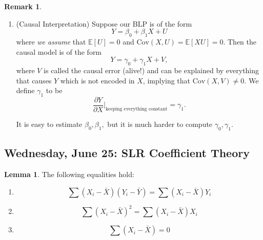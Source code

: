 \documentclass[10pt, oneside]{article}
\newcommand{\Cov}{\text{Cov}}
\newcommand{\bbE}{\mathbb{E}}
\theoremstyle{definition}
\newtheorem{rem}{Remark}
\newtheorem{lem}{Lemma}
\begin{document}
\begin{rem}
\begin{enumerate}
\begin{proof}
\begin{align*}
    &= \bbE[Y \bbE[Y \mid X]] - \bbE[\bbE[Y \mid X]^2] - b_0\bbE[V] - b_1 \bbE[VX]\\
    &= 0 - 0 - b_1\bbE[\bbE[VX \mid X]] = 0
\end{align*}
Hence, we minimize by taking derivatives and the first term drops out, yielding our result.
    \end{proof}
So we minimized $\bbE[(Y - b_0 - b_1 X)^2] = \bbE[Z^2]$ and to do this explicitly, 
\[\frac{\partial f}{\partial b_0} = -2\bbE[Y - b_0 - b_1 X] \implies \bbE[U] = 0 \qquad \frac{\partial f}{\partial b_1} = -2\bbE[X(Y - b_0 - b_1X)] \implies \bbE[UX] = 0\] Thus, 
\[\bbE[U] = 0\] and 
\[\Cov(U,X) = \bbE[UX] - \bbE[U]\bbE[X] = 0\] and thus the $\text{BLP}$ satisfies the conditions in the previous example.
\item (Causal Interpretation) Suppose our BLP is of the form 
    \[Y = \beta_0 + \beta_1 X + U\] where \textit{we assume} that $\bbE[U] = 0$ and $\Cov(X,U) = \bbE[XU] = 0.$ 
    Then the causal model is of the form
    \[Y = \gamma_0 + \gamma_1 X + V,\] where $V$ is called the causal error (alive!) and can be explained by everything that causes $Y$ which is not encoded in $X$, implying that $\Cov(X,V)\neq 0.$ We define $\gamma_1$ to be 
    \[\frac{\partial Y}{\partial X} \bigg |_{\text{keeping everything constant}} = \gamma_1.\] 

    It is easy to estimate $\beta_0, \beta_1,$ but it is much harder to compute $\gamma_0, \gamma_1.$
\end{enumerate}

\end{rem}


\newpage
\subsection{Wednesday, June 25: SLR Coefficient Theory}
\begin{lem}
    The following equalities hold:
    \begin{enumerate}
        \item \[\sum (X_i - \bar X)(Y_i - \bar Y) = \sum (X_i - \bar X)Y_i\]
        \item \[\sum (X_i - \bar X)^2 = \sum (X_i - \bar X)X_i\]
        \item \[\sum (X_i - \bar X) = 0\]
    \end{enumerate}
\end{lem}
\end{document}
